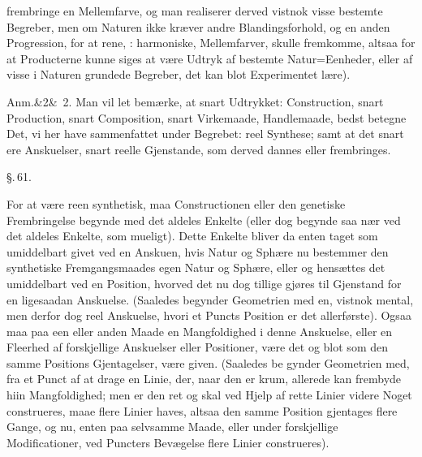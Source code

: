 \documentclass[12pt]{book}
\def\sperr#1{#1}%
\def\textit#1{#1}%
\def\emph#1{#1}%
\newcommand{\sperr}[1]{\textls[180]{#1}}
\newcommand{\parag}[1]{%
  \par\vspace{0.9\baselineskip}%
  {\centering\textit{\S.\,#1.}\par}%
  \vspace{0.35\baselineskip}%
  \noindent\hspace{\parindent}\ignorespaces
}
\newcommand{\anm}[1]{%
  \par\vspace{0.5\baselineskip}%
  \noindent\hspace{\parindent}\sperr{Anm.}\ifx&#1&\else~\textit{#1}.\fi
  \enspace\ignorespaces
}
\newcommand{\opage}[1]{\marginnote{\footnotesize\textit{[#1]}}}
\begin{document}
frembringe en Mellemfarve, og man realiserer derved vistnok visse bestemte Begreber,
men om Naturen ikke kræver andre Blandingsforhold, og en anden Progression, for at
rene, : harmoniske,
\opage{157} Mellemfarver, skulle fremkomme, altsaa for at Producterne kunne siges at være Udtryk af
bestemte \emph{Natur=Eenheder}, eller af visse i Naturen grundede Begreber, det kan
blot Experimentet lære).

\anm{2} Man vil let bemærke, at snart Udtrykket: \emph{Construction}, snart
\emph{Production}, snart \emph{Composition}, snart \emph{Virkemaade},
\emph{Handlemaade}, bedst betegne Det, vi her have sammenfattet under Begrebet: reel
Synthese; samt at det snart ere Anskuelser, snart reelle Gjenstande, som derved dannes
eller frembringes.

\parag{61}

For at være reen synthetisk, maa Constructionen eller den genetiske Frembringelse
begynde med det aldeles \emph{Enkelte} (eller dog begynde saa nær ved det aldeles
Enkelte, som mueligt). Dette Enkelte bliver da enten taget som umiddelbart givet ved en
Anskuen, hvis Natur og Sphære nu bestemmer den synthetiske Fremgangsmaades egen Natur
og Sphære, eller og hensættes det umiddelbart ved en Position, hvorved det nu dog
tillige gjøres til Gjenstand for en ligesaadan Anskuelse. (Saaledes begynder Geometrien
med en, vistnok mental, men derfor dog reel Anskuelse, hvori et Puncts Position er det
allerførste). Ogsaa maa paa een eller anden Maade en Mangfoldighed i denne Anskuelse,
eller en \emph{Fleerhed} af forskjellige Anskuelser eller Positioner, være det og blot
som den samme Positions Gjentagelser, være given. (Saaledes be%
\opage{158}gynder Geometrien med, fra et Punct af at drage en Linie, der, naar den er krum,
allerede kan frembyde hiin Mangfoldighed; men er den ret og skal ved Hjelp af rette
Linier videre Noget construeres, maae flere Linier haves, altsaa den samme Position
gjentages flere Gange, og nu, enten paa selvsamme Maade, eller under forskjellige
Modificationer, ved Puncters Bevægelse flere Linier construeres).
\end{document}
